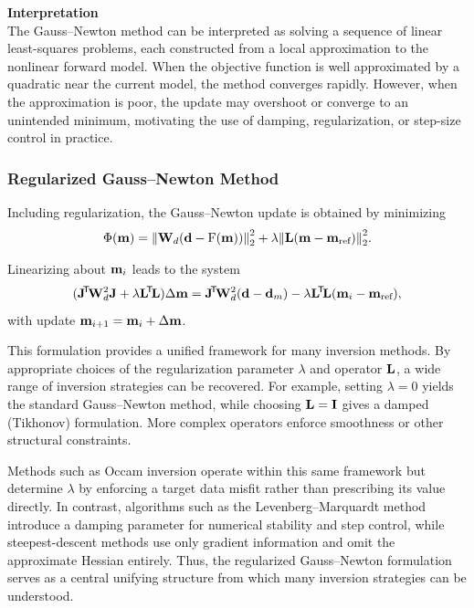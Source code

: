 \medskip
\noindent\textbf{Interpretation} \\

The Gauss--Newton method can be interpreted as solving a sequence of linear least-squares problems, each constructed from a local approximation to the nonlinear forward model. When the objective function is well approximated by a quadratic near the current model, the method converges rapidly. However, when the approximation is poor, the update may overshoot or converge to an unintended minimum, motivating the use of damping, regularization, or step-size control in practice.



\subsubsection{Regularized Gauss--Newton Method}

Including regularization, the Gauss--Newton update is obtained by minimizing
\[
    \Phi(\vb{m}) = \norm{\vb{W}_d(\vb{d} - \operatorname{F}(\vb{m}))}_2^2
    + \lambda \norm{\vb{L}(\vb{m} - \vb{m}_\text{ref})}_2^2.
\]

Linearizing about $\vb{m}_i$ leads to the system
\[
    (\vb{J}\T \vb{W}_d^2 \vb{J} + \lambda \vb{L}\T \vb{L}) \Delta \vb{m}
    = \vb{J}\T \vb{W}_d^2 (\vb{d} - \vb{d}_m)
    - \lambda \vb{L}\T \vb{L}(\vb{m}_i - \vb{m}_\text{ref}),
\]
with update $\vb{m}_{i+1} = \vb{m}_i + \Delta \vb{m}$.

This formulation provides a unified framework for many inversion methods. By appropriate choices of the regularization parameter $\lambda$ and operator $\vb{L}$, a wide range of inversion strategies can be recovered. For example, setting $\lambda = 0$ yields the standard Gauss--Newton method, while choosing $\vb{L} = \vb{I}$ gives a damped (Tikhonov) formulation. More complex operators enforce smoothness or other structural constraints.

Methods such as Occam inversion operate within this same framework but determine $\lambda$ by enforcing a target data misfit rather than prescribing its value directly. In contrast, algorithms such as the Levenberg--Marquardt method introduce a damping parameter for numerical stability and step control, while steepest-descent methods use only gradient information and omit the approximate Hessian entirely. Thus, the regularized Gauss--Newton formulation serves as a central unifying structure from which many inversion strategies can be understood.

